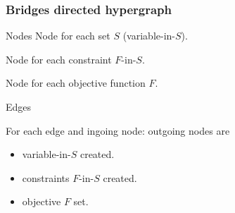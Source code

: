 \documentclass{beamer}
\begin{document}

%
%

\begin{frame}
  \frametitle{Bridges directed hypergraph}
  \vspace{-.2cm}
  \begin{block}{Nodes}
    Node for each set $S$ (variable-in-$S$).

    Node for each constraint $F$-in-$S$.

    Node for each objective function $F$.


  \end{block}
  \vspace{-.2cm}
  \begin{block}{Edges}

    For each edge and ingoing node: outgoing nodes are
    \begin{itemize}
        \item variable-in-$S$ created.
        \item constraints $F$-in-$S$ created.
        \item objective $F$ set.
    \end{itemize}
  \end{block}

\end{frame}
\end{document}
